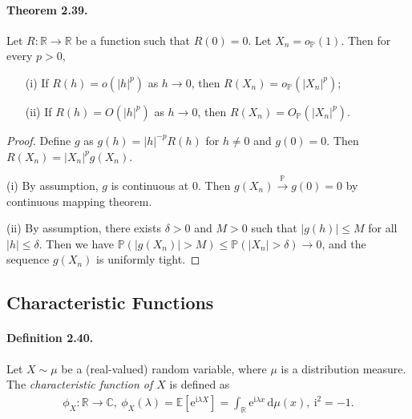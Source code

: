 \documentclass{article}
\numberwithin{equation}{section}
\newcommand{\e}{\mathrm{e}}
\newcommand{\E}{\mathbb{E}}
\renewcommand{\P}{\mathbb{P}}
\renewcommand{\d}{\mathrm{d}}
\renewcommand{\i}{\mathrm{i}}
\theoremstyle{plain}
\theoremstyle{definition}
\begin{document}
\paragraph{Theorem 2.39.\label{thm:2.39}} Let $R:\mathbb{R}\to\mathbb{R}$ be a function such that $R(0)=0$. Let $X_n=o_\P(1)$. Then for every $p>0$,
\begin{itemize}
	\item[(i)] If $R(h)=o(\vert h\vert^p)$ as $h\to 0$, then $R(X_n)=o_\P(\vert X_n\vert^p)$;
	\item[(ii)] If $R(h)=O(\vert h\vert^p)$ as $h\to 0$, then $R(X_n)=O_\P(\vert X_n\vert^p)$.
\end{itemize}
\begin{proof}
Define $g$ as $g(h)=\vert h\vert^{-p}R(h)$ for $h\neq 0$ and $g(0)=0$. Then $R(X_n)=\vert X_n\vert^p g(X_n)$.

(i) By assumption, $g$ is continuous at $0$. Then $g(X_n)\overset{\P}{\to}g(0)=0$ by continuous mapping theorem.

(ii) By assumption, there exists $\delta>0$ and $M>0$ such that $\vert g(h)\vert\leq M$ for all $\vert h\vert\leq\delta$. Then we have $\P(\vert g(X_n)\vert>M)\leq\P(\vert X_n\vert>\delta)\to 0$, and the sequence $g(X_n)$ is uniformly tight.
\end{proof}

\newpage
\subsection{Characteristic Functions}
\paragraph{Definition 2.40.\label{def:2.40}} Let $X\sim\mu$ be a (real-valued) random variable, where $\mu$ is a distribution measure. The \textit{characteristic function of $X$} is defined as
\begin{align*}
	\phi_X:\mathbb{R}\to\mathbb{C},\ \phi_X(\lambda)=\E\left[\e^{\i\lambda X}\right] = \int_\mathbb{R}\e^{\i \lambda x}\,\d \mu(x),\ \i^2=-1.
\end{align*}
\end{document}
